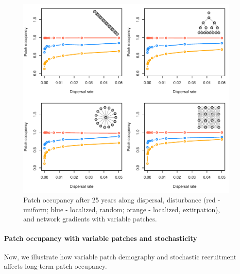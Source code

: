 \documentclass[]{article}
\let\oldparagraph\paragraph
\renewcommand{\paragraph}[1]{\oldparagraph{#1}\mbox{}}
\begin{document}
\begin{figure}[H]

{\centering \includegraphics{Managing_for_ecological_surprises_in_metapopulations_files/figure-latex/patch occupancy with variable patches-1} 

}

\caption{Patch occupancy after 25 years along  dispersal, disturbance (red - uniform; blue - localized, random; orange - localized, extirpation), and network gradients with variable patches.}\label{fig:patch occupancy with variable patches}
\end{figure}
\newpage

\hypertarget{patch-occupancy-with-variable-patches-and-stochasticity}{%
\paragraph{Patch occupancy with variable patches and
stochasticity}\label{patch-occupancy-with-variable-patches-and-stochasticity}}

Now, we illustrate how variable patch demography and stochastic
recruitment affects long-term patch occupancy.
\end{document}
